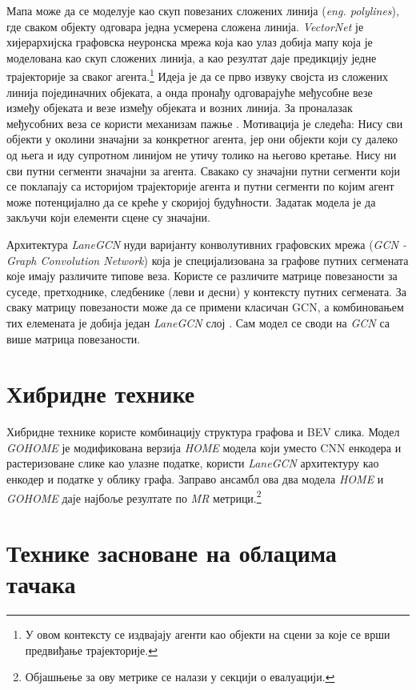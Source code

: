 \documentclass[11pt,oneside]{memoir}
\begin{document}
Мапа може да се моделује као скуп повезаних сложених линија (\textit{eng. polylines}), где сваком објекту одговара једна усмерена сложена линија. 
\textit{VectorNet} је хијерархијска графовска неуронска мрежа која као улаз добија мапу која је моделована као скуп 
сложених линија, а као резултат даје предикцију једне трајекторије за сваког агента.\footnote{У овом контексту се издвајају агенти
као објекти на сцени за које се врши предвиђање трајекторије.} Идеја је да се прво извуку својста из сложених 
линија појединачних објеката, а онда пронађу одговарајуће међусобне везе између објеката и везе између објеката и возних линија. 
За проналазак међусобних веза се користи механизам пажње \cite{attention_is_all_you_need, vectornet}.
Мотивација је следећа: Нису сви објекти у околини значајни за конкретног агента,
јер они објекти који су далеко од њега и иду супротном линијом не утичу толико на његово кретање. Нису ни сви путни сегменти значајни за агента.
Свакако су значајни путни сегменти који се поклапају са историјом трајекторије агента и путни сегменти по којим агент може потенцијално да се креће
у скоријој будућности. Задатак модела је да закључи који елементи сцене су значајни.

Архитектура \textit{LaneGCN} нуди варијанту конволутивних графовских мрежа (\textit{GCN - Graph Convolution Network}) \cite{gcn}
која је специјализована за графове путних сегмената које имају различите типове веза. Користе се различите матрице
повезаности за суседе, претходнике, следбенике (леви и десни) у контексту путних сегмената. 
За сваку матрицу повезаности може да се примени класичан GCN, а
комбиновањем тих елемената је добија један \textit{LaneGCN} слој \cite{lanegcn}. Сам модел се своди на \textit{GCN} са више матрица повезаности.

\section{Хибридне технике}

Хибридне технике користе комбинацију структура графова и BEV слика. Модел \textit{GOHOME} је модификована верзија \textit{HOME} 
модела који уместо CNN енкодера и растеризоване слике као улазне податке, користи \textit{LaneGCN} архитектуру као енкодер и податке
у облику графа. Заправо ансамбл ова два модела \textit{HOME} и \textit{GOHOME}
даје најбоље резултате по \textit{MR} метрици.\footnote{Објашњење за ову метрике се налази у секцији о евалуацији.}

\section{Технике засноване на облацима тачака}
\end{document}
